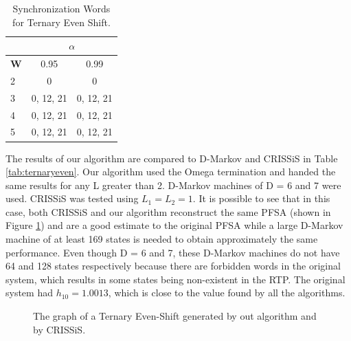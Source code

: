 {\begin{table}
\centering
\caption{Synchronization Words for Ternary Even Shift. \label{tab:ternaryevensynch}}
\begin{tabular}{|l|c|c|}
\hline
 & \multicolumn{2}{c|}{\textbf{$\alpha$}}\\
 \hline
\textbf{W} & 0.95 & 0.99 \\
\hline
2 & 0 & 0 \\ 
3 & 0, 12, 21 & 0, 12, 21 \\ 
4 & 0, 12, 21 & 0, 12, 21 \\ 
5 & 0, 12, 21 & 0, 12, 21 \\
 \hline
\end{tabular}
\end{table}

The results of our algorithm are compared to D-Markov and CRISSiS in Table \ref{tab:ternaryeven}. Our algorithm used the Omega termination and handed the same results for any L greater than 2. D-Markov machines of D = 6 and 7 were used. CRISSiS was tested using $L_1 = L_2 = 1$. It is possible to see that in this case, both CRISSiS and our algorithm reconstruct the same PFSA (shown in Figure \ref{fig:ternaryevengen}) and are a good estimate to the original PFSA  while a large D-Markov machine of at least 169 states is needed to obtain approximately the same performance. Even though D = 6 and 7, these D-Markov machines do not have 64 and 128 states respectively because there are forbidden words in the original system, which results in some states being non-existent in the RTP. The original system had $h_{10} = 1.0013$, which is close to the value found by all the algorithms.

\begin{figure}
\centering
{}
\caption{The graph of a Ternary Even-Shift generated by out algorithm and by CRISSiS.\label{fig:ternaryevengen}}
\end{figure}

}

